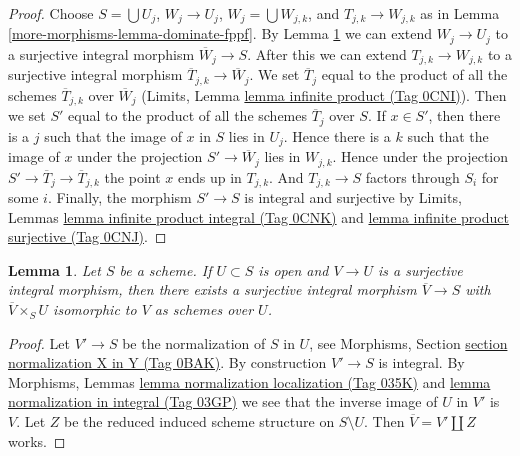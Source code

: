 \documentclass{amsart}
\theoremstyle{plain}
\newtheorem{lemma}[subsection]{Lemma}
\theoremstyle{definition}
\theoremstyle{remark}
\numberwithin{equation}{subsection}
\begin{document}
\begin{proof}
Choose $S = \bigcup U_j$, $W_j \to U_j$, $W_j = \bigcup W_{j, k}$, and
$T_{j, k} \to W_{j, k}$ as in Lemma \ref{more-morphisms-lemma-dominate-fppf}.
By Lemma \ref{more-morphisms-lemma-extend-integral-surjective-morphisms}
we can extend $W_j \to U_j$ to a surjective integral
morphism $\overline{W}_j \to S$.
After this we can extend $T_{j, k} \to W_{j, k}$ to a surjective
integral morphism $\overline{T}_{j, k} \to \overline{W}_j$.
We set $\overline{T}_j$ equal to the product of all the schemes
$\overline{T}_{j, k}$ over $\overline{W}_j$
(Limits, Lemma \href{https://stacks.math.columbia.edu/tag/0CNI}{lemma infinite product (Tag 0CNI)}).
Then we set $S'$ equal to the product of all the schemes
$\overline{T}_j$ over $S$.
If $x \in S'$, then there is a $j$ such that the image of $x$ in
$S$ lies in $U_j$. Hence there is a $k$ such that the image of
$x$ under the projection $S' \to \overline{W}_j$ lies in $W_{j, k}$.
Hence under the projection $S' \to \overline{T}_j \to \overline{T}_{j, k}$
the point $x$ ends up in $T_{j, k}$. And $T_{j, k} \to S$
factors through $S_i$ for some $i$.
Finally, the morphism $S' \to S$ is integral and surjective
by Limits, Lemmas \href{https://stacks.math.columbia.edu/tag/0CNK}{lemma infinite product integral (Tag 0CNK)} and
\href{https://stacks.math.columbia.edu/tag/0CNJ}{lemma infinite product surjective (Tag 0CNJ)}.
\end{proof}


\begin{lemma}
\label{more-morphisms-lemma-extend-integral-surjective-morphisms}
Let $S$ be a scheme. If $U \subset S$ is open and $V \to U$ is a surjective
integral morphism, then there exists a surjective integral
morphism $\overline{V} \to S$ with $\overline{V} \times_S U$
isomorphic to $V$ as schemes over $U$.
\end{lemma}

\begin{proof}
Let $V' \to S$ be the normalization of $S$ in $U$, see
Morphisms, Section \href{https://stacks.math.columbia.edu/tag/0BAK}{section normalization X in Y (Tag 0BAK)}.
By construction $V' \to S$ is integral.
By Morphisms, Lemmas \href{https://stacks.math.columbia.edu/tag/035K}{lemma normalization localization (Tag 035K)} and
\href{https://stacks.math.columbia.edu/tag/03GP}{lemma normalization in integral (Tag 03GP)} we see that
the inverse image of $U$ in $V'$ is $V$. Let $Z$ be the reduced
induced scheme structure on $S \setminus U$. Then
$\overline{V} = V' \amalg Z$ works.
\end{proof}
\end{document}
